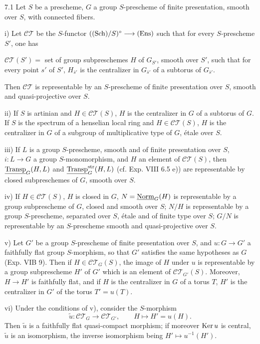 \begin{proposition}{7.1}\label{XV.7.1}
Let $S$ be a prescheme, $G$ a group $S$-prescheme of finite presentation, smooth over $S$, with connected fibers.

\noindent i) Let $\mathscr{CT}$ be the $S$-functor $(\textup{(Sch)}/S)^\circ\longrightarrow\textup{(Ens)}$ such that for every $S$-prescheme $S'$, one has

$\mathscr{CT}(S')=$ set of group subpreschemes $H$ of $G_{S'}$, smooth over $S'$, such that for every point $s'$ of $S'$, $H_{\bar s'}$ is the centralizer in $G_{\bar s'}$ of a subtorus of $G_{\bar s'}$.

Then $\mathscr{CT}$ is representable by an $S$-prescheme of finite presentation over $S$, smooth and quasi-projective over $S$.

\noindent ii) If $S$ is artinian and $H\in\mathscr{CT}(S)$, $H$ is the centralizer in $G$ of a subtorus of $G$. If $S$ is the spectrum of a henselian local ring and $H\in\mathscr{CT}(S)$, $H$ is the centralizer in $G$ of a subgroup of multiplicative type of $G$, étale over $S$.

\noindent iii) If $L$ is a group $S$-prescheme, smooth and of finite presentation over $S$, $i:L\to G$ a group $S$-monomorphism, and $H$ an element of $\mathscr{CT}(S)$, then $\underline{\operatorname{Transp}}_G(H,L)$ and $\underline{\operatorname{Transp}}_G^{\mathrm{str}}(H,L)$ (cf. Exp. VIII 6.5 e)) are representable by closed subpreschemes of $G$, smooth over $S$.

\noindent iv) If $H\in\mathscr{CT}(S)$, $H$ is closed in $G$, $N=\underline{\mathrm{Norm}}_G(H)$ is representable by a group subprescheme of $G$, closed and smooth over $S$; $N/H$ is representable by a group $S$-prescheme, separated over $S$, étale and of finite type over $S$; $G/N$ is representable by an $S$-prescheme smooth and quasi-projective over $S$.

\noindent v) Let $G'$ be a group $S$-prescheme of finite presentation over $S$, and $u:G\to G'$ a faithfully flat group $S$-morphism, so that $G'$ satisfies the same hypotheses as $G$ (Exp. VIB 9). Then if $H\in\mathscr{CT}_G(S)$, the image of $H$ under $u$ is representable by a group subprescheme $H'$ of $G'$ which is an element of $\mathscr{CT}_{G'}(S)$. Moreover, $H\to H'$ is faithfully flat, and if $H$ is the centralizer in $G$ of a torus $T$, $H'$ is the centralizer in $G'$ of the torus $T'=u(T)$.

\noindent vi) Under the conditions of v), consider the $S$-morphism
\[
\widetilde u:\mathscr{CT}_G\longrightarrow\mathscr{CT}_{G'},\qquad H\longmapsto H'=u(H).
\]
Then $\widetilde u$ is a faithfully flat quasi-compact morphism; if moreover $\operatorname{Ker} u$ is central, $\widetilde u$ is an isomorphism, the inverse isomorphism being $H'\mapsto u^{-1}(H')$.
\end{proposition}
